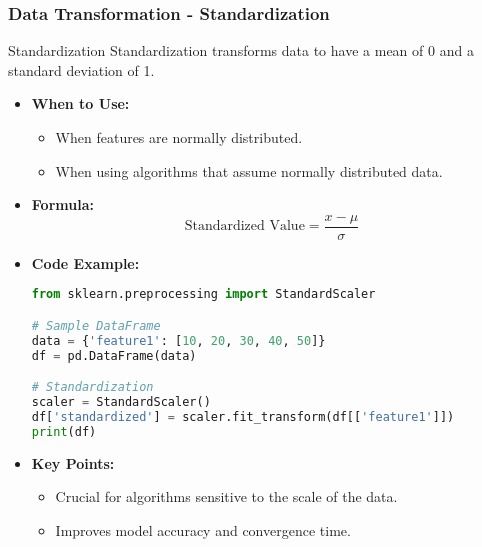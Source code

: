 \documentclass[aspectratio=169]{beamer}
\begin{document}
\begin{frame}[fragile]
    \frametitle{Data Transformation - Standardization}
    \begin{block}{Standardization}
        Standardization transforms data to have a mean of 0 and a standard deviation of 1.
        \begin{itemize}
            \item \textbf{When to Use:}
                \begin{itemize}
                    \item When features are normally distributed.
                    \item When using algorithms that assume normally distributed data.
                \end{itemize}
            \item \textbf{Formula:}
            \begin{equation}
                \text{Standardized Value} = \frac{x - \mu}{\sigma}
            \end{equation}
            \item \textbf{Code Example:}
            \begin{lstlisting}[language=Python]
from sklearn.preprocessing import StandardScaler

# Sample DataFrame
data = {'feature1': [10, 20, 30, 40, 50]}
df = pd.DataFrame(data)

# Standardization
scaler = StandardScaler()
df['standardized'] = scaler.fit_transform(df[['feature1']])
print(df)
            \end{lstlisting}
            \item \textbf{Key Points:}
                \begin{itemize}
                    \item Crucial for algorithms sensitive to the scale of the data.
                    \item Improves model accuracy and convergence time.
                \end{itemize}
        \end{itemize}
    \end{block}
\end{frame}
\end{document}
